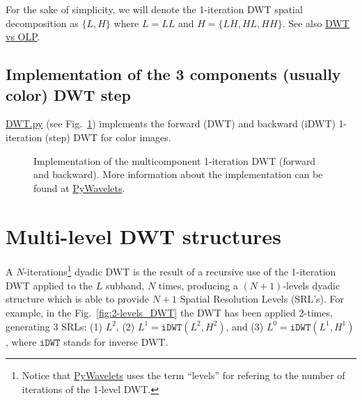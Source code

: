 For the sake of simplicity, we will denote the 1-iteration DWT spatial
decomposition as $\{L, H\}$ where $L=LL$ and $H=\{LH, HL, HH\}$. See
also
\href{https://nbviewer.jupyter.org/github/Sistemas-Multimedia/PRMC/blob/master/docs/DWT_vs_LPT.ipynb}{DWT
  vs OLP}.


\subsection{Implementation of the 3 components (usually color) DWT step}

\href{https://github.com/Sistemas-Multimedia/PRMC/blob/master/src/DWT.py}{DWT.py}
(see Fig.~\ref{fig:DWT}) implements the forward (DWT) and backward
(iDWT) 1-iteration (step) DWT for color images.

\begin{figure}
  
  \caption{Implementation of the multicomponent 1-iteration DWT
    (forward and backward). More information about the implementation
    can be found at
    \href{https://pywavelets.readthedocs.io/en/latest/index.html}{PyWavelets}.}
  \label{fig:DWT}
\end{figure}


\section{Multi-level DWT structures}

A $N$-iterations\footnote{Notice that
  \href{https://pywavelets.readthedocs.io/en/latest/index.html}{PyWavelets}
  uses the term ``levels'' for refering to the number of iterations of
  the 1-level DWT.} dyadic DWT is the result of a recursive use of the
1-iteration DWT applied to the $L$ subband, $N$ times, producing a
$(N+1)$-levels dyadic structure which is able to provide $N+1$ Spatial
Resolution Levels (SRL's). For example, in the
Fig.~\ref{fig:2-levels_DWT} the DWT has been applied 2-times,
generating 3 SRLs: (1) $L^2$, (2) $L^1=\mathtt{iDWT}(L^2, H^2)$, and
(3) $L^0=\mathtt{iDWT}(L^1, H^1)$, where $\mathtt{iDWT}$ stands for
inverse DWT.

